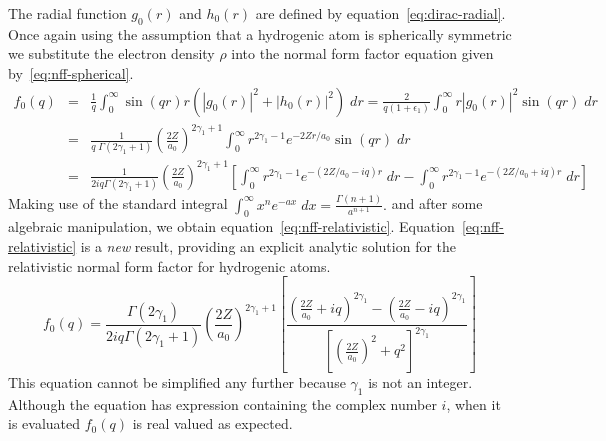     The radial function $g_0(r)$ and $h_0(r)$ are defined by
    equation~\ref{eq:dirac-radial}. Once again
    using the assumption that a hydrogenic atom is spherically symmetric we
    substitute the electron density $\rho$ into the normal form factor equation
    given by~\ref{eq:nff-spherical}.
    \begin{eqnarray*}
        f_0(q) &=&  \frac{1}{q} 
                    \int_0^\infty \sin (qr) r 
                    \left(
                        |g_0(r)|^2 + |h_0(r)|^2
                    \right) \; dr
                = \frac{2}{q(1 + \epsilon_1)} 
                    \int_0^\infty r |g_0(r)|^2 \sin (qr) \; dr
        \\
                &=& \frac{1}{q \; \Gamma(2\gamma_1 + 1)}
                    \left(
                        \frac{2Z}{a_0}  
                    \right)^{2\gamma_1 + 1}
                    \int_0^\infty r^{2\gamma_1 - 1} e^{-2Zr/a_0} \sin (qr) \; dr
        \\
                &=& \frac{1}{2iq \Gamma(2\gamma_1 + 1)}
                    \left(
                        \frac{2Z}{a_0}
                    \right)^{2\gamma_1 + 1}
                    \left[
                        \int_0^\infty r^{2\gamma_1-1} e^{-(2Z/a_0 - iq)r} \; dr
                    -
                        \int_0^\infty r^{2\gamma_1-1} e^{-(2Z/a_0 + iq)r} \; dr
                    \right]
    \end{eqnarray*}
    Making use of the standard integral
    \(
        \int_0^\infty x^n e^{-ax} \; dx = \frac{\Gamma(n+1)}{a^{n+1}}.
    \)
    and after some algebraic manipulation, we obtain
    equation~\ref{eq:nff-relativistic}.
    Equation~\ref{eq:nff-relativistic} is a \emph{new} result, providing an explicit
    analytic solution for the relativistic normal form factor for hydrogenic
    atoms.
    \begin{equation} \label{eq:nff-relativistic}
        \boxed{
            f_0(q) = 
            \frac{\Gamma(2\gamma_1)}{2iq \Gamma(2\gamma_1+1)}
            \left(
                \frac{2Z}{a_0}
            \right)^{2\gamma_1 + 1}
            \left[
                \frac{
                    \left(
                        \frac{2Z}{a_0} + iq
                    \right)^{2\gamma_1}
                    -
                    \left(
                        \frac{2Z}{a_0} - iq
                    \right)^{2\gamma_1}
                } {
                    \left[
                        \left(
                            \frac{2Z}{a_0} 
                        \right)^2   
                        + q^2
                    \right]^{2\gamma_1}
                }
            \right]
        }
    \end{equation}
    This equation cannot be simplified any further because $\gamma_1$ is not an
    integer. Although the equation has expression containing the complex number
    $i$, when it is evaluated $f_0(q)$ is real valued as expected.

